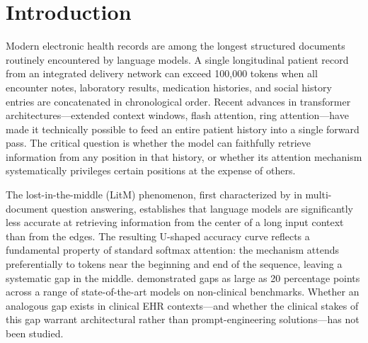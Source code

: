 \documentclass{article}
\begin{document}
\begin{abstract}
$k{=}20$, BM25 retrieves the gold-standard evidence sentence in 98.8\% of test
instructions (QCCS: 34.9\%); cross-encoder reranking achieves 96.4\% overall;
dense retrieval 94.0\%. A conditional accuracy analysis reveals that Stage-2
accuracy remains $\leq$2.6\% for all retrieval-based comparators even in the
74--82 instructions where those arms successfully retrieve the gold-evidence
sentence (by lexical overlap), while QCCS achieves 25.0\% accuracy in the 52 of
83 instructions where it does \emph{not} retrieve the gold sentence---establishing
that \textbf{query-aligned context selection, not gold-sentence retrieval, is the
binding constraint for EHR instruction following}. A no-query ablation confirms
that query conditioning accounts for +23.8 percentage points of middle-position
recall.
Code is available at \texttt{[anonymized for review]}.
\end{abstract}

\section{Introduction}
\label{sec:intro}

Modern electronic health records are among the longest structured documents
routinely encountered by language models. A single longitudinal patient record
from an integrated delivery network can exceed 100,000 tokens when all encounter
notes, laboratory results, medication histories, and social history entries are
concatenated in chronological order. Recent advances in transformer
architectures---extended context windows, flash attention, ring
attention---have made it technically possible to feed an entire patient history
into a single forward pass. The critical question is whether the model can
faithfully retrieve information from any position in that history, or whether its
attention mechanism systematically privileges certain positions at the expense of
others.

The lost-in-the-middle (LitM) phenomenon, first characterized by
\citet{liu2024lost} in multi-document question answering, establishes that
language models are significantly less accurate at retrieving information from
the center of a long input context than from the edges. The resulting U-shaped
accuracy curve reflects a fundamental property of standard softmax attention:
the mechanism attends preferentially to tokens near the beginning and end of
the sequence, leaving a systematic gap in the middle.
\citet{liu2024lost} demonstrated gaps as large as 20 percentage points across a
range of state-of-the-art models on non-clinical benchmarks. Whether an
analogous gap exists in clinical EHR contexts---and whether the clinical stakes
of this gap warrant architectural rather than prompt-engineering
solutions---has not been studied.
\end{document}
